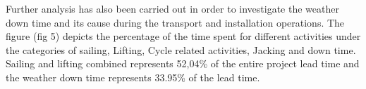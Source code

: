 Further analysis has also been carried out in order to investigate the weather down time and its cause during the transport and installation operations. The figure (fig 5) depicts the percentage of the time spent for different activities under the categories  of  sailing, Lifting, Cycle related activities, Jacking and down time. Sailing and lifting combined represents 52,04\% of the entire project lead time and the weather down time represents 33.95\% of the lead time. 